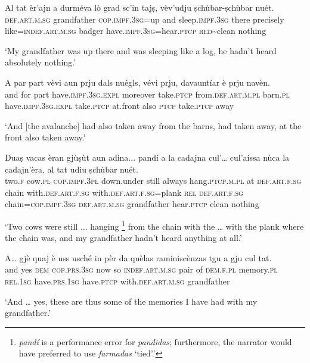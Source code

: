 \begin{linenumbers}
\gll  Al tat èr’ajn a durméva lò grad sc’in tajṣ, vèv’udju ṣchùbar-ṣchùbar nuét.  \\
 \textsc{def.art.m.sg} grandfather \textsc{cop.impf.3sg=}up and sleep.\textsc{impf.3sg} there precisely like=\textsc{indef.art.m.sg} badger have.\textsc{impf.3sg=}hear.\textsc{ptcp} \textsc{red}\textasciitilde{clean} nothing\\
\end{linenumbers}
\medskip
\glt `My grandfather was up there and was sleeping like a log, he hadn’t heard absolutely nothing.'
\medskip

\begin{linenumbers}
\gll  A par part vèvi aun prju dals nuégls, vévi prju, davauntíar è prju navèn.  \\
and for part have.\textsc{impf.3sg.expl} moreover take.\textsc{ptcp} from.\textsc{def.art.m.pl} barn.\textsc{pl} 
have.\textsc{impf.3sg.expl} take.\textsc{ptcp} at.front also \textsc{ptcp} take.\textsc{ptcp} away \\
\end{linenumbers}
\medskip
\glt `And [the avalanche] had also taken away from the barns, had taken away, at the front also taken away.'
\medskip

\begin{linenumbers}
\gll  Duaṣ vacas èran gjùṣùt aun adina... pandí a la cadajna cul’… cul’aissa nùca la cadajn'èra, al tat udiu ṣchùbar nuét.  \\
 two.\textsc{f} cow.\textsc{pl} \textsc{cop.impf.3pl} down.under still always hang.\textsc{ptcp.m.pl} at \textsc{def.art.f.sg} chain with.\textsc{def.art.f.sg} with.\textsc{def.art.f.sg}=plank \textsc{rel} \textsc{def.art.f.sg} chain=\textsc{cop.impf.3sg} \textsc{def.art.m.sg} grandfather hear.\textsc{ptcp} clean nothing\\
\end{linenumbers}
\medskip
\glt `Two cows were still ... hanging \footnote{\textit{pandí} is a performance error for \textit{pandidas}; furthermore, the narrator would have preferred to use \textit{farmadas} ‘tied’.'} from the chain with the  … with the plank where the chain was, and my grandfather hadn’t heard anything at all.’
\medskip

\begin{linenumbers}
\gll  A… gjè quaj è uss usché in pèr da quèlas raminiscènzas tgu a gju cul tat.  \\
and yes  \textsc{dem} \textsc{cop.prs.3sg} now so  \textsc{indef.art.m.sg} pair of  \textsc{dem.f.pl} memory.\textsc{pl}  \textsc{rel.1sg} have.\textsc{prs.1sg} have.\textsc{ptcp}  with.\textsc{def.art.m.sg} grandfather \\
\end{linenumbers}
\medskip
\glt `And … yes, these are thus some of the memories I have had with my grandfather.'\medskip

